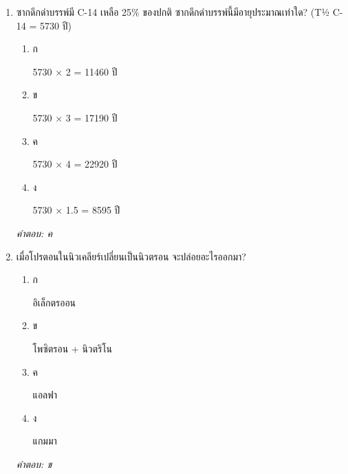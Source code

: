 \documentclass[12pt]{article}
\begin{document}
\begin{enumerate}[label=\arabic*., itemsep=0.5\baselineskip, topsep=0.5\baselineskip, leftmargin=*]
\item ซากดึกดำบรรพ์มี C-14 เหลือ 25\% ของปกติ ซากดึกดำบรรพ์นี้มีอายุประมาณเท่าใด? (T½ C-14 = 5730 ปี)
\begin{enumerate}[label=\alph*)., itemsep=0.3\baselineskip, topsep=0.3\baselineskip]
\item ก\ 
\begin{minipage}[t]{0.9\linewidth}
\raggedright 5730 × 2 = 11460 ปี
\end{minipage}
\item ข\ 
\begin{minipage}[t]{0.9\linewidth}
\raggedright 5730 × 3 = 17190 ปี
\end{minipage}
\item ค\ 
\begin{minipage}[t]{0.9\linewidth}
\raggedright 5730 × 4 = 22920 ปี
\end{minipage}
\item ง\ 
\begin{minipage}[t]{0.9\linewidth}
\raggedright 5730 × 1.5 = 8595 ปี
\end{minipage}
\end{enumerate}
\vspace{-0.3\baselineskip}
\begin{small}
\textit{คำตอบ: ค}
\end{small}

\item เมื่อโปรตอนในนิวเคลียร์เปลี่ยนเป็นนิวตรอน จะปล่อยอะไรออกมา?
\begin{enumerate}[label=\alph*)., itemsep=0.3\baselineskip, topsep=0.3\baselineskip]
\item ก\ 
\begin{minipage}[t]{0.9\linewidth}
\raggedright อิเล็กตรออน
\end{minipage}
\item ข\ 
\begin{minipage}[t]{0.9\linewidth}
\raggedright โพซิตรอน + นิวตริโน
\end{minipage}
\item ค\ 
\begin{minipage}[t]{0.9\linewidth}
\raggedright แอลฟา
\end{minipage}
\item ง\ 
\begin{minipage}[t]{0.9\linewidth}
\raggedright แกมมา
\end{minipage}
\end{enumerate}
\vspace{-0.3\baselineskip}
\begin{small}
\textit{คำตอบ: ข}
\end{small}


\end{enumerate}
\end{document}
